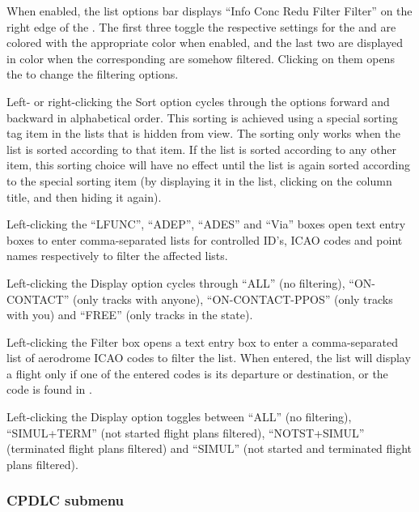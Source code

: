 \documentclass[a4paper,oneside,11pt]{memoir}
\begin{document}
When enabled, the list options bar displays “Info Conc Redu Filter Filter” on the right edge of the . The first three toggle the respective settings for the  and are colored with the appropriate color when enabled, and the last two are displayed in  color when the corresponding  are somehow filtered. Clicking on them opens the  to change the filtering options.

\bigskip

Left- or right-clicking the Sort option cycles through the options forward and backward in alphabetical order. This sorting is achieved using a special sorting tag item in the lists that is hidden from view. The sorting only works when the list is sorted according to that item. If the list is sorted according to any other item, this sorting choice will have no effect until the list is again sorted according to the special sorting item (by displaying it in the list, clicking on the column title, and then hiding it again).

\bigskip

Left-clicking the “LFUNC”, “ADEP”, “ADES” and “Via” boxes open text entry boxes to enter comma-separated lists for controlled ID’s, ICAO codes and point names respectively to filter the affected lists.

\bigskip


Left-clicking the Display option cycles through “ALL” (no filtering), “ON-CONTACT” (only tracks  with anyone), “ON-CONTACT-PPOS” (only tracks  with you) and “FREE” (only tracks in the  state).

\bigskip

Left-clicking the Filter box opens a text entry box to enter a comma-separated list of aerodrome ICAO codes to filter the list. When entered, the list will display a flight only if one of the entered codes is its departure or destination, or the code is found in .

\bigskip

Left-clicking the Display option toggles between “ALL” (no filtering), “SIMUL+TERM” (not started flight plans filtered), “NOTST+SIMUL” (terminated flight plans filtered) and “SIMUL” (not started and terminated flight plans filtered).

\subsubsection{CPDLC submenu}
\label{menu:cpdlc}
\end{document}
